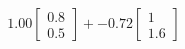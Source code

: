\documentclass[preview]{standalone}
\begin{document}
\begin{align*}
1.00 \begin{bmatrix} 0.8 \\ 0.5 \end{bmatrix} + -0.72 \begin{bmatrix} 1 \\ 1.6 \end{bmatrix}
\end{align*}
\end{document}
